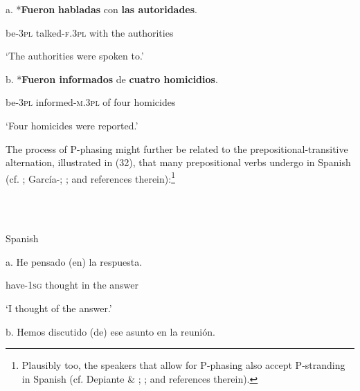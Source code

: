 \documentclass[output=paper]{langsci/langscibook}
\begin{document}
\begin{styleHTMLPreformatted}
  a.  *\textbf{Fueron}  \textbf{habladas}          con   \textbf{las  autoridades}.  
\end{styleHTMLPreformatted}

                  be{}-\textsc{3pl}   talked{}-\textsc{f.3pl} with  the  authorities

                       ‘The authorities were spoken to.’

b.   *\textbf{Fueron  informados}              de  \textbf{cuatro homicidios}.

                be{}-\textsc{3pl}   informed-\textsc{m.3pl} of    four     homicides

‘Four homicides were reported.’

\begin{styleHTMLPreformatted}
The process of P-phasing might further be related to the prepositional-transitive alternation, illustrated in (32), that many prepositional verbs undergo in Spanish (cf. \citealt{Demonte1991}; García-\citealt{Miguel1995}; \citealt{Gallego2010}; and references therein):\footnote{Plausibly too, the speakers that allow for P-phasing also accept P-stranding in Spanish (cf. Depiante \& \citealt{Thompson2013}; \citealt{Lemos2013}; and references therein).}
\end{styleHTMLPreformatted}

\begin{styleHTMLPreformatted}
\ea%
    \label{ex:key:32}
    \gll\\
        \\
    \glt
    \z

          Spanish
\end{styleHTMLPreformatted}

\begin{styleHTMLPreformatted}
a.   He             pensado (en) la     respuesta.        
\end{styleHTMLPreformatted}

\begin{styleHTMLPreformatted}
        have{}-\textsc{1sg}  thought    in   the   answer
\end{styleHTMLPreformatted}

\begin{styleHTMLPreformatted}
        ‘I thought of the answer.’
\end{styleHTMLPreformatted}

\begin{styleHTMLPreformatted}
  b.   Hemos      discutido  (de)     ese  asunto  en  la   reunión.  
\end{styleHTMLPreformatted}
\end{document}
